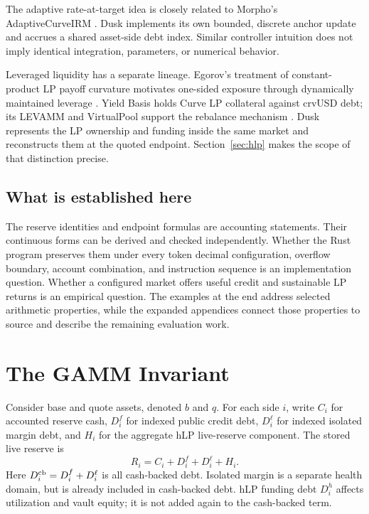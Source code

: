 The adaptive rate-at-target idea is closely related to Morpho's AdaptiveCurveIRM \cite{morpho-irm-github}. Dusk implements its own bounded, discrete anchor update and accrues a shared asset-side debt index. Similar controller intuition does not imply identical integration, parameters, or numerical behavior.

Leveraged liquidity has a separate lineage. Egorov's treatment of constant-product LP payoff curvature motivates one-sided exposure through dynamically maintained leverage \cite{egorov-yieldbasis-whitepaper}. Yield Basis holds Curve LP collateral against crvUSD debt; its LEVAMM and VirtualPool support the rebalance mechanism \cite{yieldbasis-technical}. Dusk represents the LP ownership and funding inside the same market and reconstructs them at the quoted endpoint. Section~\ref{sec:hlp} makes the scope of that distinction precise.

\subsection{What is established here}

The reserve identities and endpoint formulas are accounting statements. Their continuous forms can be derived and checked independently. Whether the Rust program preserves them under every token decimal configuration, overflow boundary, account combination, and instruction sequence is an implementation question. Whether a configured market offers useful credit and sustainable LP returns is an empirical question. The examples at the end address selected arithmetic properties, while the expanded appendices connect those properties to source and describe the remaining evaluation work.
\fi

\section{The GAMM Invariant}
\label{sec:gamm}

Consider base and quote assets, denoted $b$ and $q$. For each side $i$, write $C_i$ for accounted reserve cash, $D_i^f$ for indexed public credit debt, $D_i^\ell$ for indexed isolated margin debt, and $H_i$ for the aggregate hLP live-reserve component. The stored live reserve is
\begin{equation}
\boxed{R_i=C_i+D_i^f+D_i^\ell+H_i.}
\label{eq:ledger}
\end{equation}
Here $D_i^{\rm cb}=D_i^f+D_i^\ell$ is all cash-backed debt. Isolated margin is a separate health domain, but is already included in cash-backed debt. hLP funding debt $D_i^h$ affects utilization and vault equity; it is not added again to the cash-backed term.

